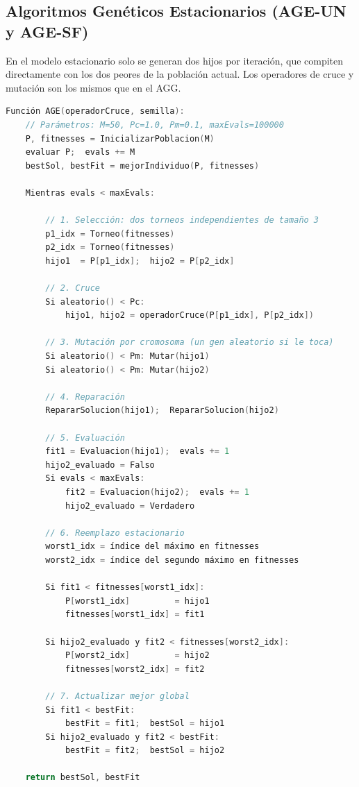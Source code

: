 \documentclass[12pt]{article}
\begin{document}
 
\subsection{Algoritmos Genéticos Estacionarios (AGE-UN y AGE-SF)}
 
En el modelo estacionario solo se generan dos hijos por iteración, que compiten
directamente con los dos peores de la población actual. Los operadores de cruce
y mutación son los mismos que en el AGG.
 
\begin{lstlisting}[language=C++, mathescape=true,
    caption={Pseudocódigo del AGE (modelo estacionario)},
    label={lst:age_opt}]
Función AGE(operadorCruce, semilla):
    // Parámetros: M=50, Pc=1.0, Pm=0.1, maxEvals=100000
    P, fitnesses = InicializarPoblacion(M)
    evaluar P;  evals += M
    bestSol, bestFit = mejorIndividuo(P, fitnesses)
 
    Mientras evals < maxEvals:
 
        // 1. Selección: dos torneos independientes de tamaño 3
        p1_idx = Torneo(fitnesses)
        p2_idx = Torneo(fitnesses)
        hijo1  = P[p1_idx];  hijo2 = P[p2_idx]
 
        // 2. Cruce
        Si aleatorio() < Pc:
            hijo1, hijo2 = operadorCruce(P[p1_idx], P[p2_idx])
 
        // 3. Mutación por cromosoma (un gen aleatorio si le toca)
        Si aleatorio() < Pm: Mutar(hijo1)
        Si aleatorio() < Pm: Mutar(hijo2)
 
        // 4. Reparación
        RepararSolucion(hijo1);  RepararSolucion(hijo2)
 
        // 5. Evaluación
        fit1 = Evaluacion(hijo1);  evals += 1
        hijo2_evaluado = Falso
        Si evals < maxEvals:
            fit2 = Evaluacion(hijo2);  evals += 1
            hijo2_evaluado = Verdadero
 
        // 6. Reemplazo estacionario
        worst1_idx = índice del máximo en fitnesses
        worst2_idx = índice del segundo máximo en fitnesses
 
        Si fit1 < fitnesses[worst1_idx]:
            P[worst1_idx]         = hijo1
            fitnesses[worst1_idx] = fit1
 
        Si hijo2_evaluado y fit2 < fitnesses[worst2_idx]:
            P[worst2_idx]         = hijo2
            fitnesses[worst2_idx] = fit2
 
        // 7. Actualizar mejor global
        Si fit1 < bestFit:
            bestFit = fit1;  bestSol = hijo1
        Si hijo2_evaluado y fit2 < bestFit:
            bestFit = fit2;  bestSol = hijo2
 
    return bestSol, bestFit
\end{lstlisting}
 
\end{document}
